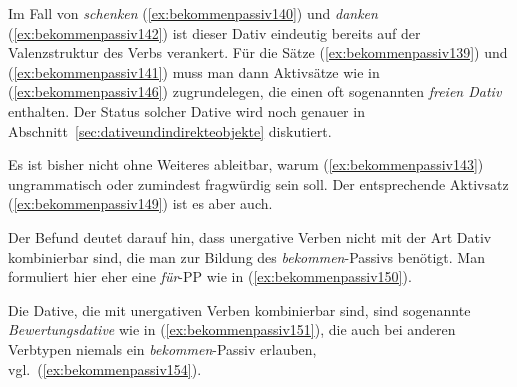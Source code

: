 Im Fall von \textit{schenken} (\ref{ex:bekommenpassiv140}) und \textit{danken} (\ref{ex:bekommenpassiv142}) ist dieser Dativ eindeutig bereits auf der Valenzstruktur des Verbs verankert.
Für die Sätze (\ref{ex:bekommenpassiv139}) und (\ref{ex:bekommenpassiv141}) muss man dann Aktivsätze wie in (\ref{ex:bekommenpassiv146}) zugrundelegen, die einen oft sogenannten \textit{freien Dativ} enthalten.
Der Status solcher Dative wird noch genauer in Abschnitt~\ref{sec:dativeundindirekteobjekte} diskutiert.

\begin{exe}
  \ex\label{ex:bekommenpassiv146}
  \begin{xlist}
  \end{xlist}
\end{exe}

Es ist bisher nicht ohne Weiteres ableitbar, warum (\ref{ex:bekommenpassiv143}) ungrammatisch oder zumindest fragwürdig sein soll.
Der entsprechende Aktivsatz (\ref{ex:bekommenpassiv149}) ist es aber auch.

\begin{exe}
\end{exe}


Der Befund deutet darauf hin, dass unergative Verben nicht mit der Art Dativ kombinierbar sind, die man zur Bildung des \textit{bekommen}-Passivs benötigt.
Man formuliert hier eher eine \textit{für}-PP wie in (\ref{ex:bekommenpassiv150}).

\begin{exe}
\end{exe}

Die Dative, die mit unergativen Verben kombinierbar sind, sind sogenannte \textit{Bewertungsdative} wie in (\ref{ex:bekommenpassiv151}), die auch bei anderen Verbtypen niemals ein \textit{bekommen}-Passiv erlauben, vgl.\ (\ref{ex:bekommenpassiv154}).


\begin{exe}
  \ex\label{ex:bekommenpassiv151}
  \begin{xlist}
  \end{xlist}
  \ex\label{ex:bekommenpassiv154}
  \begin{xlist}
  \end{xlist}
\end{exe}

